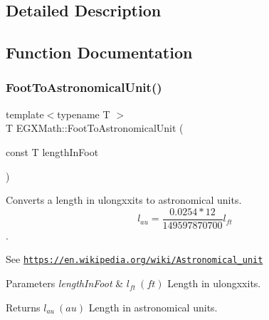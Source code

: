 \subsection{Detailed Description}


\subsection{Function Documentation}
\mbox{\label{group___e_g_x_math-_conversions-_length_conversions-_imperial-_foot-_astronomical_ga18d4fb64ab846e864256de77e664033a}} 
\subsubsection{\texorpdfstring{Foot\+To\+Astronomical\+Unit()}{FootToAstronomicalUnit()}}
{\footnotesize\ttfamily template$<$typename T $>$ \\
T E\+G\+X\+Math\+::\+Foot\+To\+Astronomical\+Unit (\begin{DoxyParamCaption}\item[{const T}]{length\+In\+Foot }\end{DoxyParamCaption})}



Converts a length in ulongxxits to astronomical units. \[ l_{au}=\frac{0.0254 * 12}{149597870700} l_{ft} \]. 

See \href{https://en.wikipedia.org/wiki/Astronomical_unit}{\tt https\+://en.\+wikipedia.\+org/wiki/\+Astronomical\+\_\+unit} 
\begin{DoxyParams}{Parameters}
{\em length\+In\+Foot} & $ l_{ft}\ (ft)$ Length in ulongxxits. \\
\hline
\end{DoxyParams}
\begin{DoxyReturn}{Returns}
$ l_{au}\ (au)$ Length in astronomical units. 
\end{DoxyReturn}
\mbox{\label{group___e_g_x_math-_conversions-_length_conversions-_imperial-_foot-_astronomical_gabfbad3d88e53552b7d0ed791c7d75dc7}} 
